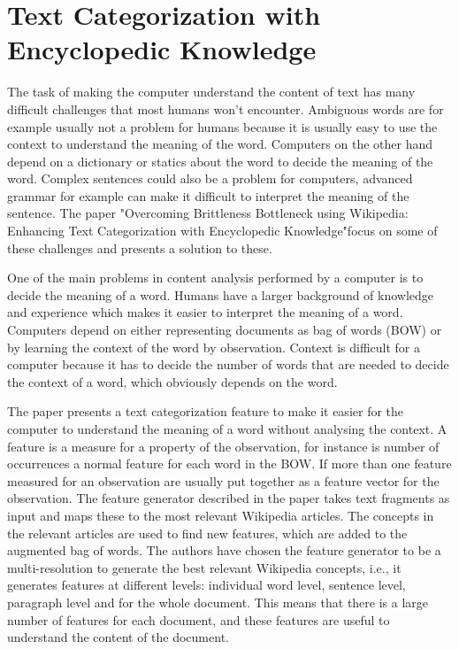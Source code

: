 \section{Text Categorization with Encyclopedic Knowledge}
The task of making the computer understand the content of text has many difficult challenges that most humans won't encounter. Ambiguous words are for example usually not a problem for humans because it is usually easy to use the context to understand the meaning of the word. Computers on the other hand depend on a dictionary or statics about the word to decide the meaning of the word. Complex sentences could also be a problem for computers, advanced grammar for example can make it difficult to interpret the meaning of the sentence. The paper "Overcoming Brittleness Bottleneck using Wikipedia: Enhancing Text Categorization with Encyclopedic Knowledge"\cite{brittleness}focus on some of these challenges and presents a solution to these. 

One of the main problems in  content analysis performed by a computer is to decide the meaning of a word. Humans have a larger background of knowledge and experience which makes it easier to interpret the meaning of a word. Computers depend on either representing documents as bag of words (BOW) or by learning the context of the word by observation. Context is difficult for a computer because it has to decide the number of words that are needed to decide the context of a word, which obviously depends on the word. 



The paper presents a text categorization feature to make it easier for the computer to understand the meaning of a word without analysing the context. A feature is a measure for a property of the observation, for instance is number of occurrences a normal feature for each word in the  BOW. If more than one feature measured for an observation are  usually put together as a feature vector for the observation. The feature generator described in the paper takes text fragments as input and maps these to the most relevant Wikipedia articles. The concepts in the relevant articles are used to find new features, which are added to the augmented bag of words. The authors have chosen the feature generator to be a multi-resolution to generate the best relevant Wikipedia concepts, i.e., it generates features at different levels: individual word level, sentence level, paragraph level and for the whole document. This means that there is a large number of features for each document, and these features are useful to understand the content of the document. 

